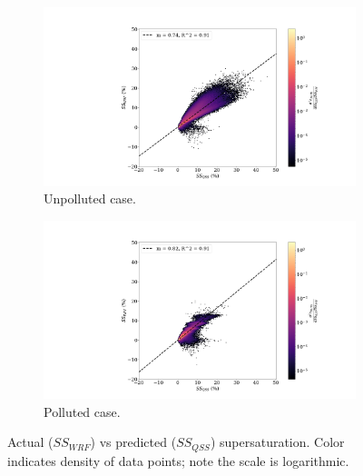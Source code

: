 \documentclass{article}
\begin{document}
\begin{figure}[ht]
	\centering
	\begin{subfigure}{0.7\textwidth}
		\includegraphics[width=\textwidth]{revmywrf/v1_FINAL_heatmap_ss_qss_vs_ss_wrf_Unpolluted_figure.png}
		\caption{Unpolluted case.}
		\label{wrfvsqssunpoll}
	\end{subfigure}
	\begin{subfigure}{0.7\textwidth}
		\includegraphics[width=\textwidth]{revmywrf/v1_FINAL_heatmap_ss_qss_vs_ss_wrf_Polluted_figure.png}
		\caption{Polluted case.}
		\label{wrfvsqsspoll}
	\end{subfigure}
	\caption{Actual ($SS_{WRF}$) vs predicted ($SS_{QSS}$) supersaturation. Color indicates density of data points; note the scale is logarithmic.}
	\label{wrfvsqss}
\end{figure}
\end{document}

